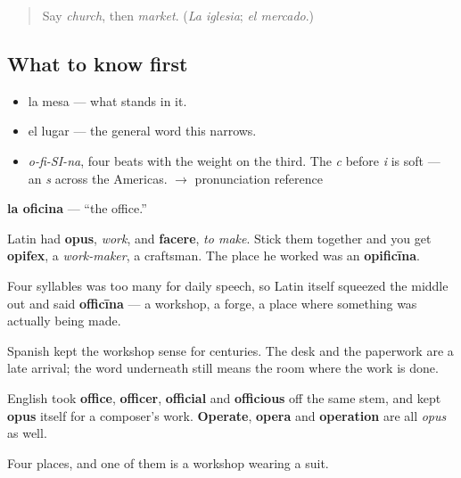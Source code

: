 \begin{quote}
Say \emph{church}, then \emph{market}. (\emph{La iglesia}; \emph{el mercado}.)
\end{quote}

\subsection*{What to know first}
\begin{itemize}
\raggedright
  \item la mesa — what stands in it.
  \item el lugar — the general word this narrows.
\end{itemize}

\begin{sounds}
\begin{itemize}
\raggedright
  \item \emph{o-fi-SI-na}, four beats with the weight on the third. The \emph{c} before \emph{i} is soft — an \emph{s} across the Americas. $\to$ pronunciation reference
\end{itemize}
\end{sounds}

\begin{cousinweb}
\textbf{la oficina} — \textquotedblleft{}the office.\textquotedblright{}

Latin had \textbf{opus}, \emph{work}, and \textbf{facere}, \emph{to make}. Stick them together and you get \textbf{opifex}, a \emph{work-maker}, a craftsman. The place he worked was an \textbf{opificīna}.

Four syllables was too many for daily speech, so Latin itself squeezed the middle out and said \textbf{officīna} — a workshop, a forge, a place where something was actually being made.

Spanish kept the workshop sense for centuries. The desk and the paperwork are a late arrival; the word underneath still means the room where the work is done.

English took \textbf{office}, \textbf{officer}, \textbf{official} and \textbf{officious} off the same stem, and kept \textbf{opus} itself for a composer's work. \textbf{Operate}, \textbf{opera} and \textbf{operation} are all \emph{opus} as well.
\end{cousinweb}

\begin{grammarlens}[title={What you've built}]
Four places, and one of them is a workshop wearing a suit.
\end{grammarlens}

